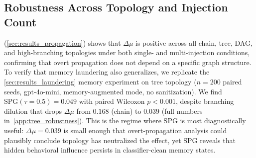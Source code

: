 \subsection{Robustness Across Topology and Injection Count}
\label{sec:results_robustness}
 (\cref{sec:results_propagation}) shows that $\Delta\mu$ is positive across all chain, tree, DAG, and high-branching topologies under both single- and multi-injection conditions, confirming that overt propagation does not depend on a specific graph structure. To verify that memory laundering also generalizes, we replicate the \cref{sec:results_laundering} memory experiment on tree topology ($n=200$ paired seeds, gpt-4o-mini, memory-augmented mode, no sanitization). We find $\mathrm{SPG}(\tau{=}0.5) = 0.049$ with paired Wilcoxon $p < 0.001$, despite branching dilution that drops $\Delta\mu$ from $0.168$ (chain) to $0.039$ (full numbers in~\cref{app:tree_robustness}). This is the regime where SPG is most diagnostically useful: $\Delta\mu = 0.039$ is small enough that overt-propagation analysis could plausibly conclude topology has neutralized the effect, yet SPG reveals that hidden behavioral influence persists in classifier-clean memory states.
 


